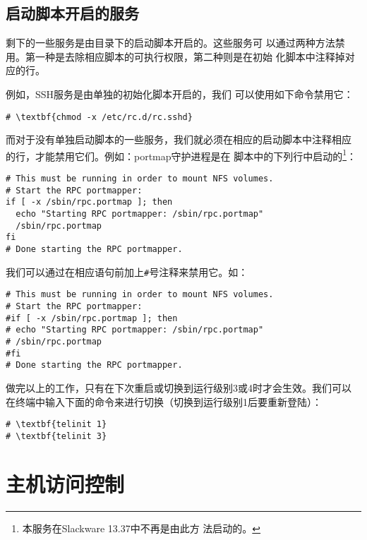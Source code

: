 \subsection{启动脚本开启的服务}
\label{sec:security:disablingServices:init}
剩下的一些服务是由目录下的启动脚本开启的。这些服务可
以通过两种方法禁用。第一种是去除相应脚本的可执行权限，第二种则是在初始
化脚本中注释掉对应的行。

例如，SSH服务是由单独的初始化脚本开启的，我们
可以使用如下命令禁用它：
\begin{Verbatim}[frame=single, commandchars=\\\{\}]
# \textbf{chmod -x /etc/rc.d/rc.sshd}
\end{Verbatim}

而对于没有单独启动脚本的一些服务，我们就必须在相应的启动脚本中注释相应
的行，才能禁用它们。例如：portmap守护进程是在
脚本中的下列行中启动的\footnote{本服务在Slackware 13.37中不再是由此方
  法启动的。}：
\begin{Verbatim}[frame=single, commandchars=\\\{\}]
# This must be running in order to mount NFS volumes.
# Start the RPC portmapper:
if [ -x /sbin/rpc.portmap ]; then
  echo "Starting RPC portmapper: /sbin/rpc.portmap"
  /sbin/rpc.portmap
fi
# Done starting the RPC portmapper.
\end{Verbatim}
我们可以通过在相应语句前加上\texttt{\#}号注释来禁用它。如：
\begin{Verbatim}[frame=single, commandchars=\\\{\}]
# This must be running in order to mount NFS volumes.
# Start the RPC portmapper:
#if [ -x /sbin/rpc.portmap ]; then
# echo "Starting RPC portmapper: /sbin/rpc.portmap"
# /sbin/rpc.portmap
#fi
# Done starting the RPC portmapper.
\end{Verbatim}

做完以上的工作，只有在下次重启或切换到运行级别3或4时才会生效。我们可以
在终端中输入下面的命令来进行切换（切换到运行级别1后要重新登陆）：
\begin{Verbatim}[frame=single, commandchars=\\\{\}]
# \textbf{telinit 1}
# \textbf{telinit 3}
\end{Verbatim}


\section{主机访问控制}
\label{sec:security:hostAccessControl}

